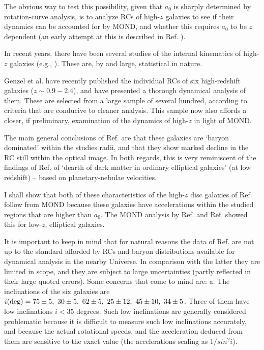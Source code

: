 \documentclass[twocolumn,showpacs,amsmath,amssymb,prd,nofootinbib]
{revtex4}
\def\sss{\scriptscriptstyle}
\def\_#1{_{\sss #1}}
\def\az{a\_{0}}
\begin{document}
The obvious way to test this possibility, given that $\az$ is sharply determined by rotation-curve analysis, is to analyze RCs of high-$z$ galaxies to see if their dynamics can be accounted for by MOND, and whether this requires $\az$ to be $z$ dependent (an early attempt at this is described in Ref. \cite{milgrom08}).
\par
In recent years, there have been several studies of the internal kinematics of high-$z$ galaxies (e.g., \cite{price16,wuyts16,lang17}). These are, by and large, statistical in nature.
\par
Genzel et al. \cite{genzel17} have recently published the individual RCs of six high-redshift galaxies
($z\sim 0.9-2.4$), and have presented a thorough dynamical analysis of them.
These are selected from a large sample of several hundred, according to criteria that are conducive to cleaner analysis.
This sample now also affords a closer, if preliminary, examination of the dynamics of high-$z$ in light of MOND.
\par
The main general conclusions of Ref. \cite{genzel17} are that these galaxies are `baryon dominated' within the studies radii, and that they show marked decline in the RC still within the optical image.
In both regards, this is very reminiscent of the findings of Ref. \cite{romanowsky03} of `dearth of dark matter in ordinary elliptical galaxies' (at low redshift) -- based on planetary-nebulae velocities.
\par
I shall show that both of these characteristics of the high-$z$ disc galaxies of Ref. \cite{genzel17} follow from MOND because these galaxies have accelerations within the studied regions that are higher than $\az$. The MOND analysis by Ref. \cite{ms03} and Ref. \cite{tian16} showed this for low-$z$, elliptical galaxies.
\par
It is important to keep in mind that for natural reasons the data of Ref. \cite{genzel17} are not up to the standard afforded by RCs and baryon distributions available for dynamical analysis in the nearby Universe. In comparison with the latter they are limited in scope, and they are subject to large uncertainties (partly reflected in their large quoted errors).
Some concerns that come to mind are: a. The inclinations of the six galaxies are $i({\rm deg})=75\pm 5,~30\pm 5,~62\pm 5,~25\pm 12,~45\pm 10,~34\pm 5$. Three of them have low inclinations $i< 35$ degrees. Such low inclinations are generally considered problematic because it is difficult to measure such low inclinations accurately, and because the actual rotational speeds, and the acceleration deduced from them are sensitive to the exact value (the accelerations scaling as $1/sin^2 i$).
\end{document}
